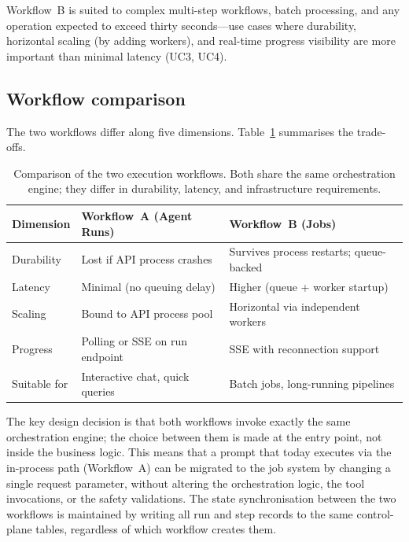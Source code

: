 \documentclass[a4paper,noexaminfo]{sapthesis}
\begin{document}
Workflow~B is suited to complex multi-step workflows, batch processing,
and any operation expected to exceed thirty seconds---use cases where
durability, horizontal scaling (by adding workers), and real-time
progress visibility are more important than minimal latency (UC3, UC4).

\subsection{Workflow comparison}

The two workflows differ along five dimensions.
Table~\ref{tab:workflow-comparison} summarises the trade-offs.

\begin{table}[ht]
\centering
\caption{Comparison of the two execution workflows.  Both share
the same orchestration engine; they differ in durability, latency,
and infrastructure requirements.}
\label{tab:workflow-comparison}
\small
\begin{tabularx}{\textwidth}{@{}l X X@{}}
    \hline
    \textbf{Dimension} & \textbf{Workflow~A (Agent Runs)} &
        \textbf{Workflow~B (Jobs)} \\
    \hline
    Durability &
        Lost if API process crashes &
        Survives process restarts; queue-backed \\
    Latency &
        Minimal (no queuing delay) &
        Higher (queue + worker startup) \\
    Scaling &
        Bound to API process pool &
        Horizontal via independent workers \\
    Progress &
        Polling or SSE on run endpoint &
        SSE with reconnection support \\
    Suitable for &
        Interactive chat, quick queries &
        Batch jobs, long-running pipelines \\
    \hline
\end{tabularx}
\end{table}

The key design decision is that both workflows invoke exactly the same
orchestration engine; the choice between them is made at the entry point,
not inside the business logic.  This means that a prompt that today
executes via the in-process path (Workflow~A) can be migrated to the job
system by changing a single request parameter, without altering the
orchestration logic, the tool invocations, or the safety validations.  The state synchronisation
between the two workflows is maintained by writing all run and step records
to the same control-plane tables, regardless of which workflow creates them.
\end{document}
